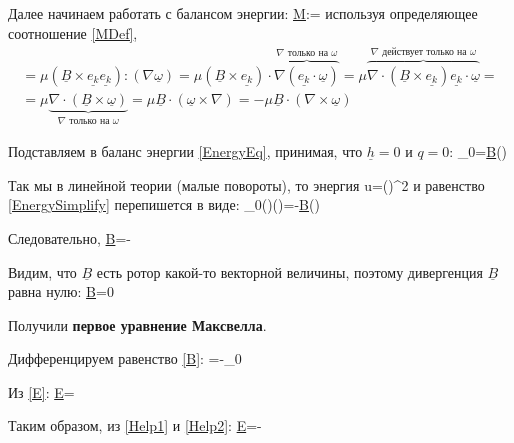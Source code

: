 \documentclass[main.tex]{subfiles}
\begin{document}
Далее начинаем работать с балансом энергии:
\beq
\underline{\underline{M}}:\nabla\underline{\omega}=
\eeq
используя определяющее соотношение \eqref{MDef},
\begin{multline}
=\mu\left(\underline{B}\times\underline{e_k}\underline{e_k}\right):\left(\nabla\underline{\omega}\right)=\mu\left(\underline{B}\times\underline{e_k}\right)\cdot\overbrace{\nabla\left(\underline{e_k}\cdot\underline{\omega}\right)}^{\nabla\text{ только на }\omega}=\mu\overbrace{\nabla\cdot\left(\underline{B}\times\underline{e_k}\right)\underline{e_k}\cdot\underline{\omega}}^{\nabla\text{ действует только на }\omega}=\\=\mu\underbrace{\nabla\cdot\left(\underline{B}\times\underline{\omega}\right)}_{\nabla\text{ только на }\omega}=\mu\underline{B}\cdot\left(\underline{\omega}\times\nabla\right)=-\mu\underline{B}\cdot\left(\nabla\times\underline{\omega}\right)
\end{multline}

Подставляем в баланс энергии \eqref{EnergyEq}, принимая, что $\underline{h}=0$ и $q=0$:
\beq\label{EnergySimplify}
\rho_0=\mu\underline{B}\cdot\left(\nabla\times{}\right)
\eeq

Так мы в линейной теории (малые повороты), то энергия
\beq
u=\kappa\left(\nabla\times\underline{\theta}\right)^2
\eeq 
и равенство \eqref{EnergySimplify} перепишется в виде:
\beq
\rho_0\kappa\left(\nabla\times\underline{\theta}\right)\cdot{}\left(\nabla\cdot\underline{\theta}\right)=-\mu\underline{B}\cdot{}\left(\nabla\times\underline{\theta}\right)
\eeq

Следовательно,
\beq\label{B}
\underline{B}=-\frac{\rho_0\kappa}{\mu}\nabla\times\underline{\theta}
\eeq

Видим, что $\underline{B}$ есть ротор какой-то векторной величины, поэтому дивергенция $\underline{B}$ равна нулю:
\beq
\nabla\cdot\underline{B}=0
\eeq

Получили \textbf{первое уравнение Максвелла}.

Дифференцируем равенство \eqref{B}:
\beq\label{Help1}
=-\rho_0\frac{\kappa}{\mu}\nabla\times{}
\eeq

Из \eqref{E}:
\beq\label{Help2}
\nabla\times\underline{E}=\nabla\times{}
\eeq

Таким образом, из \eqref{Help1} и \eqref{Help2}:
\beq
\nabla\times\underline{E}=-
\eeq
\end{document}
